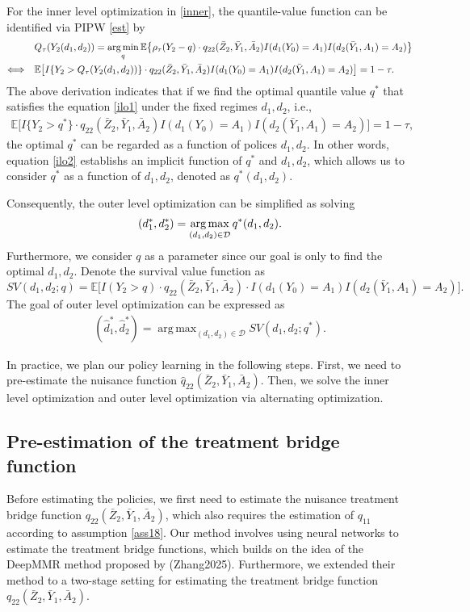 \documentclass[10pt]{article}
\DeclareMathOperator*{\argmax}{arg\,max}
\DeclareMathOperator*{\argmin}{arg\,min}
\theoremstyle{remark} \newtheorem{rem}{Remark}
\begin{document}
For the inner level optimization in \eqref{inner}, the quantile-value function can be identified via PIPW \eqref{est} by 
\begin{align}
    &Q_\tau(Y_2(d_1,d_2)) = \argmin_{q}\mathbb{E} \bigl\{\rho_\tau(Y_{2}-q)\cdot q_{22}(\bar Z_{2}, \bar Y_{1}, \bar A_{2}) I(d_1(Y_{0})=A_1)I(d_2(\bar Y_{1},A_1)=A_2) \bigr\} \notag\\
    \Longleftrightarrow \quad & \mathbb{E}\big[I\{Y_2 > Q_\tau(Y_2(d_1,d_2))\}\cdot q_{22}(\bar Z_{2}, \bar Y_{1}, \bar A_{2}) I(d_1(Y_{0})=A_1)I(d_2(\bar Y_{1},A_1)=A_2) \big]= 1-\tau. \label{ilo1}
\end{align}
The above derivation indicates that if we find the optimal quantile value $q^*$ that satisfies the equation \eqref{ilo1} under the fixed regimes $d_1,d_2$, i.e., 
\begin{align}
    \mathbb{E}\big[I\{Y_2 > q^*\}\cdot q_{22}(\bar Z_{2}, \bar Y_{1}, \bar A_{2}) I(d_1(Y_{0})=A_1)I(d_2(\bar Y_{1},A_1)=A_2) \big]= 1-\tau, \label{ilo2}
\end{align}
the optimal $q^*$ can be regarded as a function of polices $d_1,d_2$.
In other words, equation \eqref{ilo2} establishs an implicit function of $q^*$ and $d_1,d_2$,
which allows us to consider $q^*$ as a function of $d_1,d_2$, denoted as $q^*(d_1,d_2)$.

Consequently, the outer level optimization can be simplified as solving
\begin{align}
    (d_1^{*},d_2^{*}) = \argmax_{(d_1,d_2)\in\mathcal{D}}q^*(d_1,d_2). \notag
\end{align}
Furthermore, we consider $q$ as a parameter since our goal is only to find the optimal $d_1,d_2$. 
Denote the survival value function as
$$
SV(d_1,d_2;q) = \mathbb{E} \big[I(Y_2 > q)\cdot q_{22}(\bar Z_{2}, \bar Y_{1}, \bar A_{2}) \cdot  I(d_1(Y_0)=A_1)I(d_2(\bar Y_1, A_1)=A_2) \big].
$$
The goal of outer level optimization can be expressed as 
\begin{align}
    (\hat d_1^*,\hat d_2^*) = \argmax_{(d_1,d_2)\in\mathcal{D}} SV(d_1,d_2;q^*).
\end{align}

In practice, we plan our policy learning in the following steps.
First, we need to pre-estimate the nuisance function $\hat q_{22}(\bar Z_2,\bar Y_1, \bar A_2)$.
Then, we solve the inner level optimization and outer level optimization via alternating optimization.


\subsection{Pre-estimation of the treatment bridge function}
Before estimating the policies, we first need to estimate the nuisance treatment bridge function $q_{22}(\bar Z_{2}, \bar Y_{1}, \bar A_{2})$, which also requires the estimation of $q_{11}$ according to assumption \ref{ass18}.
Our method involves using neural networks to estimate the treatment bridge functions, which builds on the idea of the DeepMMR method proposed by (Zhang2025).
Furthermore, we extended their method to a two-stage setting for estimating the treatment bridge function $q_{22}(\bar Z_{2}, \bar Y_{1}, \bar A_{2})$.
\end{document}
